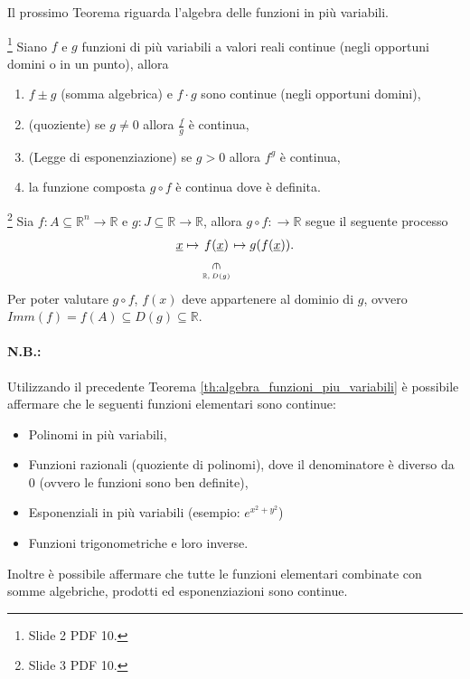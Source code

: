 Il prossimo Teorema riguarda l'algebra delle funzioni in più variabili.
\begin{theorem}\label{th:algebra_funzioni_piu_variabili}\footnote{Slide 2 PDF 10.}
    Siano $f$ e $g$ funzioni di più variabili a valori reali continue (negli opportuni domini o in un punto), allora
    \begin{enumerate}
        \item $f\pm g$ (somma algebrica) e $f\cdot g$ sono continue (negli opportuni domini),
        \item (quoziente) se $g\neq 0$ allora $\frac{f}{g}$ è continua,
        \item (Legge di esponenziazione) se $g>0$ allora $f^g$ è continua,
        \item la funzione composta $g\circ f$ è continua dove è definita.
    \end{enumerate}
\end{theorem}

\begin{remark}\footnote{Slide 3 PDF 10.}
    Sia $f\colon A\subseteq\mathbb R^n\rightarrow\mathbb R$ e $g:J\subseteq\mathbb R\rightarrow\mathbb R$, allora $g\circ f\colon \mathbb\rightarrow\mathbb R$ segue il seguente processo
    \begin{equation*}
        \uline x\mapsto \underset{\underset{\mathbb R,\, D(g)}{\vertin}}{f(\uline x)}\mapsto g(f(\uline x)).
    \end{equation*}
    Per poter valutare $g\circ f$, $f(x)$ deve appartenere al dominio di $g$, ovvero $Imm(f)=f(A)\subseteq D(g)\subseteq\mathbb R$.
\end{remark}

\paragraph{N.B.:} Utilizzando il precedente Teorema \ref{th:algebra_funzioni_piu_variabili} è possibile affermare che le seguenti funzioni elementari sono continue:
\begin{itemize}
    \item Polinomi in più variabili,
    \item Funzioni razionali (quoziente di polinomi), dove il denominatore è diverso da 0 (ovvero le funzioni sono ben definite),
    \item Esponenziali in più variabili (esempio: $e^{x^2+y^2}$)
    \item Funzioni trigonometriche e loro inverse.
\end{itemize}
Inoltre è possibile affermare che tutte le funzioni elementari combinate con somme algebriche, prodotti ed esponenziazioni sono continue.


